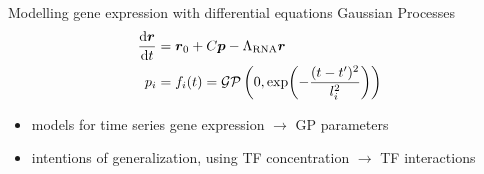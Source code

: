 \begin{frame}{Modelling gene expression with differential equations}
Gaussian Processes~\cite{Anderson2009}
\begin{subequations}
\label{eq:gaussian_process}
\begin{align}
\dv{\boldsymbol{r}}{t} &=
\boldsymbol{r}_0 + C \boldsymbol{p} - \Lambda_\text{RNA} \boldsymbol{r}
\\
p_i &= f_i(t) =
\mathcal{GP}\left(0, \exp(-\frac{(t-t')^2}{l_i^2})\right)
\end{align}
\end{subequations}
\begin{itemize}
    \item \textcolor{darkgray!50!gray}{models for time series gene expression $\rightarrow$ GP parameters}
    \item \textcolor{darkgray!50!gray}{intentions of generalization, using TF concentration $\rightarrow$ TF interactions}
\end{itemize}
\end{frame}
